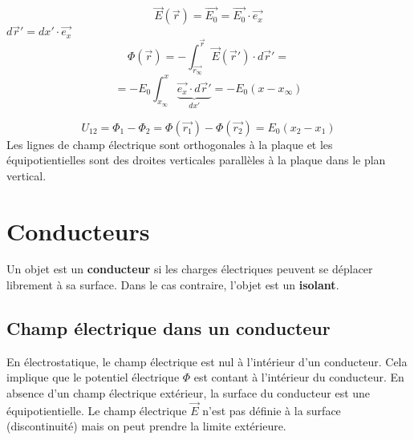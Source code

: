 \documentclass[
    11pt,
    a4paper,
    oneside,
    headinlcude, footinclude,
    twoside,
]{report}
\renewcommand{\vec}[1]{\overrightarrow{#1}}
\begin{document}
\begin{enumerate}
        \begin{center}
            \begin{minipage}{.55\linewidth}
                \setlength{\parskip}{.3em}
                \begin{equation}
                    \label{eq:7.11}
                    \vec E(\vec r) = \vec{E_{0}} = \vec{E_{0}} \cdot \vec{e_{x}}
                \end{equation}
                $d\vec r' = dx' \cdot \vec{e_{x}}$
                $$\Phi(\vec r) = - \int_{\vec{r_{\infty}}}^{\vec r} \vec E(\vec r')
                \cdot d\vec r'=$$
            \begin{equation}
                \label{eq:7.12}
                 = - E_0 \int_{x_{\infty}}^{x} \underbrace{\vec{e_{x}} \cdot d
             \vec r'}_{dx'}= - E_0(x-x_{\infty}) 
            \end{equation}
            \end{minipage}
            \begin{minipage}{.44\linewidth}
            \end{minipage}
        \end{center}
        \begin{equation}
            \label{eq:7.13}
            U_{12} = \Phi_1 - \Phi_2 = \Phi(\vec{r_{1}}) - \Phi(\vec{r_{2}}) = E_0(x_2-x_1)
        \end{equation}
        Les lignes de champ électrique sont orthogonales à la plaque et les
        équipotientielles sont des droites verticales parallèles à la plaque
        dans le plan vertical.
\end{enumerate}


\section{Conducteurs}
\label{sec:conducteurs}

Un objet est un \textbf{conducteur}  si les charges électriques peuvent se
déplacer librement à sa surface. Dans le cas contraire, l'objet est un \textbf{isolant}.

\subsection{Champ électrique dans un conducteur}
\label{sub:champ_electrique_dans_un_conducteur}

En électrostatique, le champ électrique est nul à l'intérieur d'un conducteur.
Cela implique que le potentiel électrique $\Phi$ est contant à l'intérieur du
conducteur. En absence d'un champ électrique extérieur, la surface du
conducteur est une équipotientielle. Le champ électrique $\vec E$ n'est pas
définie à la surface (discontinuité) mais on peut prendre la limite extérieure.
\end{document}
